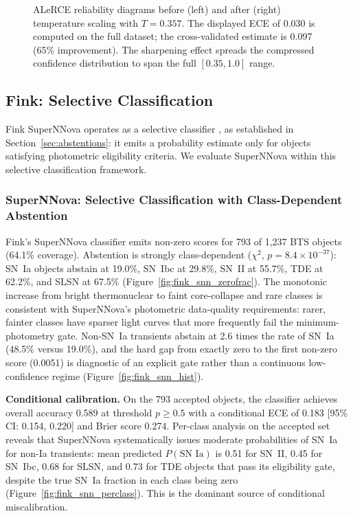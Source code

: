 \documentclass[twocolumn]{aastex631}
\begin{document}
\begin{figure}
\caption{ALeRCE reliability diagrams before (left) and after (right) temperature scaling with $T = 0.357$. The displayed ECE of 0.030 is computed on the full dataset; the cross-validated estimate is 0.097 (65\% improvement). The sharpening effect spreads the compressed confidence distribution to span the full $[0.35, 1.0]$ range. \label{fig:alerce_tempscaling}}
\end{figure}


\subsection{Fink: Selective Classification}\label{sec:fink}

Fink SuperNNova operates as a selective classifier \citep{geifman2017},
as established in Section~\ref{sec:abstentions}: it emits a probability
estimate only for objects satisfying photometric eligibility criteria.
We evaluate SuperNNova within this selective classification framework.

\subsubsection{SuperNNova: Selective Classification with Class-Dependent Abstention}\label{sec:fink_snn}

Fink's SuperNNova classifier \citep{moller2020} emits non-zero scores for 793 of 1,237 BTS objects (64.1\% coverage). Abstention is strongly class-dependent ($\chi^2$, $p = 8.4 \times 10^{-37}$): SN~Ia objects abstain at 19.0\%, SN~Ibc at 29.8\%, SN~II at 55.7\%, TDE at 62.2\%, and SLSN at 67.5\% (Figure~\ref{fig:fink_snn_zerofrac}). The monotonic increase from bright thermonuclear to faint core-collapse and rare classes is consistent with SuperNNova's photometric data-quality requirements: rarer, fainter classes have sparser light curves that more frequently fail the minimum-photometry gate. Non-SN~Ia transients abstain at 2.6 times the rate of SN~Ia (48.5\% versus 19.0\%), and the hard gap from exactly zero to the first non-zero score (0.0051) is diagnostic of an explicit gate rather than a continuous low-confidence regime (Figure~\ref{fig:fink_snn_hist}).

\textbf{Conditional calibration.} On the 793 accepted objects, the classifier achieves overall accuracy 0.589 at threshold $p \ge 0.5$ with a conditional ECE of 0.183 [95\% CI: 0.154, 0.220] and Brier score 0.274. Per-class analysis on the accepted set reveals that SuperNNova systematically issues moderate probabilities of SN~Ia for non-Ia transients: mean predicted $P(\text{SN~Ia})$ is 0.51 for SN~II, 0.45 for SN~Ibc, 0.68 for SLSN, and 0.73 for TDE objects that pass its eligibility gate, despite the true SN~Ia fraction in each class being zero (Figure~\ref{fig:fink_snn_perclass}). This is the dominant source of conditional miscalibration.
\end{document}
